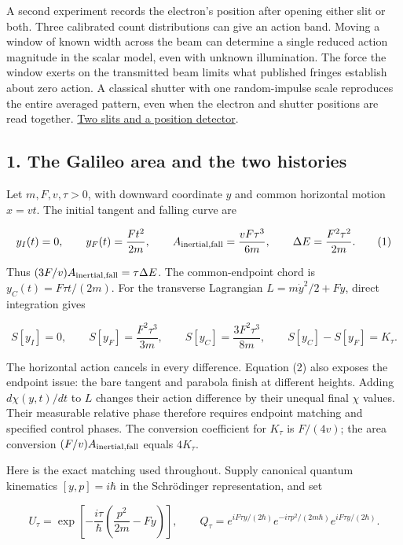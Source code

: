 \documentclass[11pt,a4paper]{article}
\begin{document}
A second experiment records the electron's position after opening either
slit or both. Three calibrated count distributions can give an action
band. Moving a window of known width across the beam can determine a
single reduced action magnitude in the scalar model, even with unknown
illumination. The force the window exerts on the transmitted beam limits
what published fringes establish about zero action. A classical shutter
with one random-impulse scale reproduces the entire averaged pattern,
even when the electron and shutter positions are read together.
\hyperref[two-slits-and-a-position-detector]{Two slits and a position
detector}.

\subsection{1. The Galileo area and the two
histories}\label{the-galileo-area-and-the-two-histories}

Let \(m,F,v,\tau>0\), with downward coordinate \(y\) and common
horizontal motion \(x=vt\). The initial tangent and falling curve are

\[
y_I(t)=0,\qquad y_F(t)=\frac{Ft^2}{2m},\qquad
A_{\rm inertial,fall}=\frac{vF\tau^3}{6m},\qquad
\Delta E=\frac{F^2\tau^2}{2m}.
\tag{1}
\]

Thus \((3F/v)A_{\rm inertial,fall}=\tau\Delta E\). The common-endpoint
chord is \(y_C(t)=F\tau t/(2m)\). For the transverse Lagrangian
\(L=m\dot y^2/2+Fy\), direct integration gives

\[
S[y_I]=0,\qquad S[y_F]=\frac{F^2\tau^3}{3m},\qquad
S[y_C]=\frac{3F^2\tau^3}{8m},\qquad S[y_C]-S[y_F]=K_\tau.
\tag{2}
\]

The horizontal action cancels in every difference. Equation (2) also
exposes the endpoint issue: the bare tangent and parabola finish at
different heights. Adding \(d\chi(y,t)/dt\) to \(L\) changes their
action difference by their unequal final \(\chi\) values. Their
measurable relative phase therefore requires endpoint matching and
specified control phases. The conversion coefficient for \(K_\tau\) is
\(F/(4v)\); the area conversion \((F/v)A_{\rm inertial,fall}\) equals
\(4K_\tau\).

Here is the exact matching used throughout. Supply canonical quantum
kinematics \([y,p]=i\hbar\) in the Schrödinger representation, and set

\[
U_\tau=\exp\left[-\frac{i\tau}{\hbar}
\left(\frac{p^2}{2m}-Fy\right)\right],\qquad
Q_\tau=e^{iF\tau y/(2\hbar)}
e^{-i\tau p^2/(2m\hbar)}e^{iF\tau y/(2\hbar)}.
\]
\end{document}
